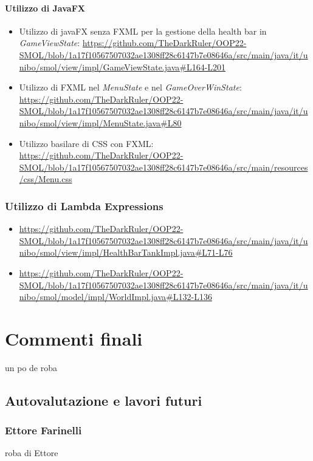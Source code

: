 \documentclass[a4paper,12pt]{report}
\begin{document}
\subsubsection*{Utilizzo di JavaFX}
\begin{itemize}
    \item Utilizzo di javaFX senza FXML per la gestione della health bar in \emph{GameViewState}: \url{https://github.com/TheDarkRuler/OOP22-SMOL/blob/1a17f10567507032ae1308ff28c6147b7e08646a/src/main/java/it/unibo/smol/view/impl/GameViewState.java#L164-L201}
    \item Utilizzo di FXML nel \emph{MenuState} e nel \emph{GameOverWinState}: \url{https://github.com/TheDarkRuler/OOP22-SMOL/blob/1a17f10567507032ae1308ff28c6147b7e08646a/src/main/java/it/unibo/smol/view/impl/MenuState.java#L80}
    \item Utilizzo basilare di CSS con FXML: \url{https://github.com/TheDarkRuler/OOP22-SMOL/blob/1a17f10567507032ae1308ff28c6147b7e08646a/src/main/resources/css/Menu.css}
\end{itemize}

\subsection*{Utilizzo di Lambda Expressions}
\begin{itemize}
    \item \url{https://github.com/TheDarkRuler/OOP22-SMOL/blob/1a17f10567507032ae1308ff28c6147b7e08646a/src/main/java/it/unibo/smol/view/impl/HealthBarTankImpl.java#L71-L76}
    \item \url{https://github.com/TheDarkRuler/OOP22-SMOL/blob/1a17f10567507032ae1308ff28c6147b7e08646a/src/main/java/it/unibo/smol/model/impl/WorldImpl.java#L132-L136}
\end{itemize}

\chapter{Commenti finali}

un po de roba

\section{Autovalutazione e lavori futuri}
\subsection*{Ettore Farinelli}
roba di Ettore
\end{document}
